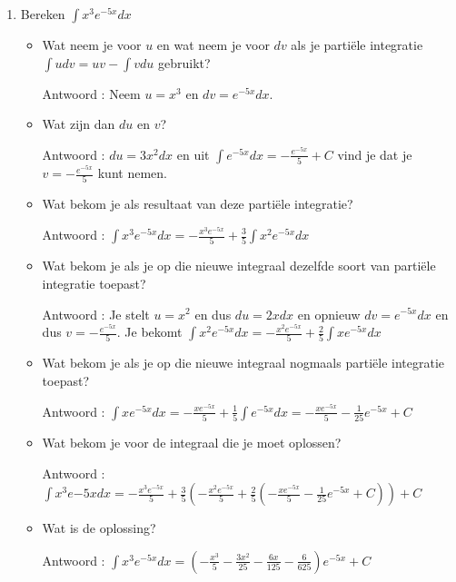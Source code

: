 \begin{enumerate}
	
	\item Bereken $\int x^3e^{-5x}dx$
	
	\begin{itemize}
		\item Wat neem je voor $u$ en wat neem je voor $dv$ als je parti\"ele integratie $\int udv = uv -\int vdu$ gebruikt?
		
		Antwoord : Neem $u=x^3$ en $dv=e^{-5x}dx$.
		
		\item Wat zijn dan $du$ en $v$?
		
		Antwoord : $du=3x^2dx$ en uit $\int e^{-5x}dx=-\frac {e^{-5x}}{5} +C$ vind je dat je $v=-\frac {e^{-5x}}{5}$ kunt nemen.
		
		\item Wat bekom je als resultaat van deze partiële integratie?
		
		Antwoord : $\int x^3e^{-5x}dx = - \frac {x^3e^{-5x}}{5}+\frac {3}{5} \int x^2e^{-5x}dx$
		
		\item Wat bekom je als je op die nieuwe integraal dezelfde soort van parti\"ele integratie toepast?
		
		Antwoord : Je stelt $u=x^2$ en dus $du=2xdx$ en opnieuw $dv=e^{-5x}dx$ en dus $v=-\frac {e^{-5x}}{5}$.
		Je bekomt $\int x^2e^{-5x}dx =  - \frac {x^2e^{-5x}}{5}+\frac {2}{5} \int xe^{-5x}dx$
		
		\item Wat bekom je als je op die nieuwe integraal nogmaals parti\"ele integratie toepast?
		
		Antwoord : $\int xe^{-5x}dx = - \frac {xe^{-5x}}{5}+\frac {1}{5} \int e^{-5x}dx= - \frac {xe^{-5x}}{5}-\frac{1}{25}e^{-5x}+C$
		
		\item Wat bekom je voor de integraal die je moet oplossen?
		
		Antwoord : $\int x^3e{-5x}dx = - \frac {x^3e^{-5x}}{5}+\frac {3}{5} \left(  - \frac {x^2e^{-5x}}{5}+\frac {2}{5} \left( - \frac {xe^{-5x}}{5}-\frac{1}{25}e^{-5x}+C  \right)   \right)+C
		$
		
		\item Wat is de oplossing?
		
		Antwoord : $\int x^3e^{-5x}dx = \left( -\frac{x^3}{5}-\frac{3x^2}{25}-\frac{6x}{125}-\frac{6}{625}   \right)e^{-5x}+C$
		
	\end{itemize}
	

\end{enumerate}
